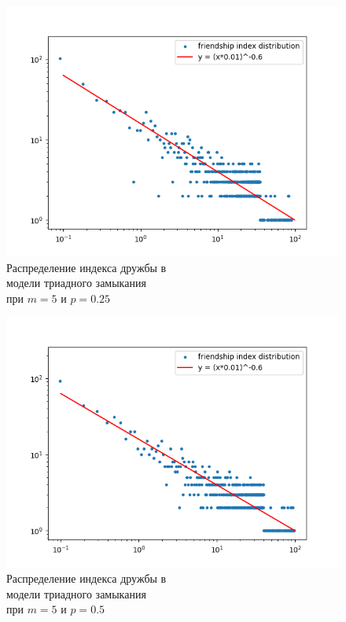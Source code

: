 \documentclass[bachelor, och, diploma]{SCWorks}
\begin{document}
\begin{figure}[!ht]
    \centering
    \includegraphics[scale=0.5]{diploma_results/static_log/triad_dist_beta_5_0.25.png}
    \caption{Распределение индекса дружбы  в\\ модели триадного замыкания\\ при $m=5$ и $p=0.25$}
\end{figure}
\begin{figure}[!ht]
    \centering
    \includegraphics[scale=0.5]{diploma_results/static_log/triad_dist_beta_5_0.5.png}
    \caption{Распределение индекса дружбы  в\\ модели триадного замыкания\\ при $m=5$ и $p=0.5$}
\end{figure}
\end{document}

